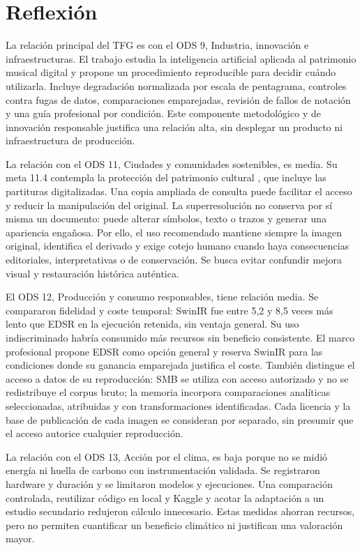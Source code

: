 \newpage

\section*{Reflexión}

La relación principal del TFG es con el ODS 9, Industria, innovación e
infraestructuras. El trabajo estudia la inteligencia artificial aplicada al patrimonio musical
digital y propone un procedimiento reproducible para decidir cuándo utilizarla. Incluye
degradación normalizada por escala de pentagrama, controles contra fugas de datos,
comparaciones emparejadas, revisión de fallos de notación y una guía profesional por
condición. Este componente metodológico y de innovación responsable justifica una relación alta,
sin desplegar un producto ni infraestructura de producción.

La relación con el ODS 11, Ciudades y comunidades sostenibles, es media. Su meta 11.4 contempla la
protección del patrimonio cultural \cite{un2030Agenda}, que incluye las partituras digitalizadas.
Una copia ampliada de consulta puede facilitar el acceso y reducir la manipulación del
original. La superresolución no conserva por sí misma un documento: puede alterar
símbolos, texto o trazos y generar una apariencia engañosa. Por ello, el uso recomendado mantiene
siempre la imagen original, identifica el derivado y exige cotejo humano cuando haya consecuencias
editoriales, interpretativas o de conservación. Se busca evitar confundir mejora visual y
restauración histórica auténtica.

El ODS 12, Producción y consumo responsables, tiene relación media. Se compararon
fidelidad y coste temporal: SwinIR fue entre 5,2 y 8,5 veces más lento que EDSR en la ejecución
retenida, sin ventaja general. Su uso indiscriminado habría consumido más recursos sin beneficio
consistente. El marco profesional propone EDSR como opción general y reserva SwinIR para las
condiciones donde su ganancia emparejada justifica el coste. También distingue el acceso a datos
de su reproducción: SMB se utiliza con acceso autorizado y no se redistribuye el corpus bruto;
la memoria incorpora comparaciones analíticas seleccionadas, atribuidas y con
transformaciones identificadas. Cada licencia y la base de publicación de cada imagen se consideran por
separado, sin presumir que el acceso autorice cualquier reproducción.

La relación con el ODS 13, Acción por el clima, es baja porque no se midió energía ni huella de
carbono con instrumentación validada. Se registraron hardware y duración y se limitaron modelos y
ejecuciones. Una comparación controlada, reutilizar código en local y Kaggle y acotar la adaptación
a un estudio secundario redujeron cálculo innecesario. Estas medidas ahorran recursos,
pero no permiten cuantificar un beneficio climático ni justifican una valoración mayor.

